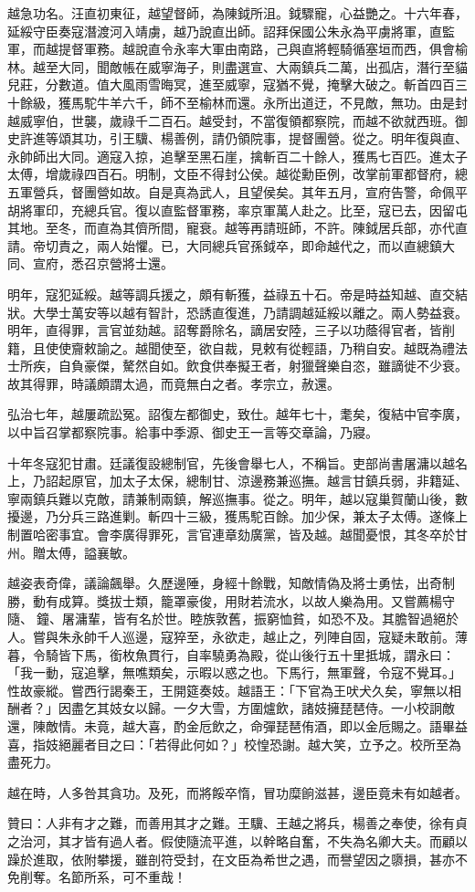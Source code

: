 \begin{pinyinscope}
越急功名。汪直初東征，越望督師，為陳鉞所沮。鉞驟寵，心益艷之。十六年春，延綏守臣奏寇潛渡河入靖虜，越乃說直出師。詔拜保國公朱永為平虜將軍，直監軍，而越提督軍務。越說直令永率大軍由南路，己與直將輕騎循塞垣而西，俱會榆林。越至大同，聞敵帳在威寧海子，則盡選宣、大兩鎮兵二萬，出孤店，潛行至貓兒莊，分數道。值大風雨雪晦冥，進至威寧，寇猶不覺，掩擊大破之。斬首四百三十餘級，獲馬駝牛羊六千，師不至榆林而還。永所出道迂，不見敵，無功。由是封越威寧伯，世襲，歲祿千二百石。越受封，不當復領都察院，而越不欲就西班。御史許進等頌其功，引王驥、楊善例，請仍領院事，提督團營。從之。明年復與直、永帥師出大同。適寇入掠，追擊至黑石崖，擒斬百二十餘人，獲馬七百匹。進太子太傅，增歲祿四百石。明制，文臣不得封公侯。越從勳臣例，改掌前軍都督府，總五軍營兵，督團營如故。自是真為武人，且望侯矣。其年五月，宣府告警，命佩平胡將軍印，充總兵官。復以直監督軍務，率京軍萬人赴之。比至，寇已去，因留屯其地。至冬，而直為其儕所間，寵衰。越等再請班師，不許。陳鉞居兵部，亦代直請。帝切責之，兩人始懼。已，大同總兵官孫鉞卒，即命越代之，而以直總鎮大同、宣府，悉召京營將士還。

明年，寇犯延綏。越等調兵援之，頗有斬獲，益祿五十石。帝是時益知越、直交結狀。大學士萬安等以越有智計，恐誘直復進，乃請調越延綏以離之。兩人勢益衰。明年，直得罪，言官並劾越。詔奪爵除名，謫居安陸，三子以功蔭得官者，皆削籍，且使使齎敕諭之。越聞使至，欲自裁，見敕有從輕語，乃稍自安。越既為禮法士所疾，自負豪傑，驁然自如。飲食供奉擬王者，射獵聲樂自恣，雖謫徙不少衰。故其得罪，時議頗謂太過，而竟無白之者。孝宗立，赦還。

弘治七年，越屢疏訟冤。詔復左都御史，致仕。越年七十，耄矣，復結中官李廣，以中旨召掌都察院事。給事中季源、御史王一言等交章論，乃寢。

十年冬寇犯甘肅。廷議復設總制官，先後會舉七人，不稱旨。吏部尚書屠滽以越名上，乃詔起原官，加太子太保，總制甘、涼邊務兼巡撫。越言甘鎮兵弱，非籍延、寧兩鎮兵難以克敵，請兼制兩鎮，解巡撫事。從之。明年，越以寇巢賀蘭山後，數擾邊，乃分兵三路進剿。斬四十三級，獲馬駝百餘。加少保，兼太子太傅。遂條上制置哈密事宜。會李廣得罪死，言官連章劾廣黨，皆及越。越聞憂恨，其冬卒於甘州。贈太傅，謚襄敏。

越姿表奇偉，議論飆舉。久歷邊陲，身經十餘戰，知敵情偽及將士勇怯，出奇制勝，動有成算。獎拔士類，籠罩豪俊，用財若流水，以故人樂為用。又嘗薦楊守隨、鐘、屠滽輩，皆有名於世。睦族敦舊，振窮恤貧，如恐不及。其膽智過絕於人。嘗與朱永帥千人巡邊，寇猝至，永欲走，越止之，列陣自固，寇疑未敢前。薄暮，令騎皆下馬，銜枚魚貫行，自率驍勇為殿，從山後行五十里抵城，謂永曰：「我一動，寇追擊，無噍類矣，示暇以惑之也。下馬行，無軍聲，令寇不覺耳。」性故豪縱。嘗西行謁秦王，王開筵奏妓。越語王：「下官為王吠犬久矣，寧無以相酬者？」因盡乞其妓女以歸。一夕大雪，方圍爐飲，諸妓擁琵琶侍。一小校詗敵還，陳敵情。未竟，越大喜，酌金卮飲之，命彈琵琶侑酒，即以金卮賜之。語畢益喜，指妓絕麗者目之曰：「若得此何如？」校惶恐謝。越大笑，立予之。校所至為盡死力。

越在時，人多咎其貪功。及死，而將餒卒惰，冒功糜餉滋甚，邊臣竟未有如越者。

贊曰：人非有才之難，而善用其才之難。王驥、王越之將兵，楊善之奉使，徐有貞之治河，其才皆有過人者。假使隨流平進，以幹略自奮，不失為名卿大夫。而顧以躁於進取，依附攀援，雖剖符受封，在文臣為希世之遇，而譽望因之隳損，甚亦不免削奪。名節所系，可不重哉！


\end{pinyinscope}